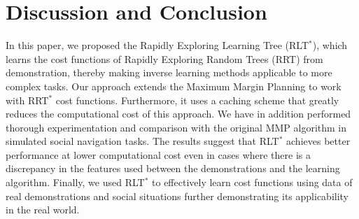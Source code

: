 \documentclass{article}  %
\begin{document}



\vspace{-1mm}
\section{Discussion and Conclusion}
In this paper, we proposed the Rapidly Exploring Learning Tree (RLT$^*$), which learns the cost functions of Rapidly Exploring Random Trees (RRT) from demonstration, thereby making inverse learning methods applicable to more complex tasks. Our approach extends the Maximum Margin Planning to work with RRT$^*$ cost functions. Furthermore, it uses a caching scheme that greatly reduces the computational cost of this approach. We have in addition performed thorough experimentation and comparison with the original MMP algorithm in simulated social navigation tasks. The results suggest that RLT$^*$ achieves better performance at lower computational cost even in cases where there is a discrepancy in the features used between the demonstrations and the learning algorithm. Finally, we used RLT$^*$ to effectively learn cost functions using data of real demonstrations and social situations further demonstrating its applicability in the real world.
\end{document}

